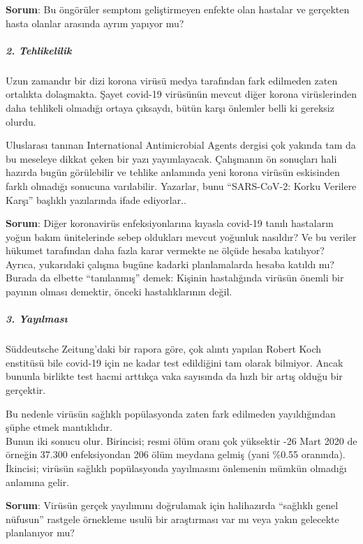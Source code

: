 \textbf{Sorum}: Bu öngörüler semptom geliştirmeyen enfekte olan hastalar
ve gerçekten hasta olanlar arasında ayrım yapıyor mu?

\hypertarget{2-tehlikelilik}{%
\subparagraph{\texorpdfstring{\textbf{2.
Tehlikelilik}}{2. Tehlikelilik}}\label{2-tehlikelilik}}

Uzun zamandır bir dizi korona virüsü medya tarafından fark edilmeden
zaten ortalıkta dolaşmakta. Şayet covid-19 virüsünün mevcut diğer korona
virüslerinden daha tehlikeli olmadığı ortaya çıksaydı, bütün karşı
önlemler belli ki gereksiz olurdu.

Uluslarası tanınan International Antimicrobial Agents dergisi çok
yakında tam da bu meseleye dikkat çeken bir yazı yayımlayacak.
Çalışmanın ön sonuçları hali hazırda bugün görülebilir ve tehlike
anlamında yeni korona virüsün eskisinden farklı olmadığı sonucuna
varılabilir. Yazarlar, bunu ``SARS-CoV-2: Korku Verilere Karşı''
başlıklı yazılarında ifade ediyorlar..

\textbf{Sorum}: Diğer koronavirüs enfeksiyonlarına kıyasla covid-19
tanılı hastaların yoğun bakım ünitelerinde sebep oldukları mevcut
yoğunluk nasıldır? Ve bu veriler hükumet tarafından daha fazla karar
vermekte ne ölçüde hesaba katılıyor? Ayrıca, yukarıdaki çalışma bugüne
kadarki planlamalarda hesaba katıldı mı? Burada da elbette
``tanılanmış'' demek: Kişinin hastalığında virüsün önemli bir payının
olması demektir, önceki hastalıklarının değil.

\hypertarget{3-yayux131lmasux131}{%
\subparagraph{\texorpdfstring{\textbf{3.
Yayılması}}{3. Yayılması}}\label{3-yayux131lmasux131}}

Süddeutsche Zeitung'daki bir rapora göre, çok alıntı yapılan Robert Koch
enstitüsü bile covid-19 için ne kadar test edildiğini tam olarak
bilmiyor. Ancak bununla birlikte test hacmi arttıkça vaka sayısında da
hızlı bir artış olduğu bir gerçektir.

Bu nedenle virüsün sağlıklı popülasyonda zaten fark edilmeden
yayıldığından şüphe etmek mantıklıdır.\\
Bunun iki sonucu olur. Birincisi; resmi ölüm oranı çok yüksektir -26
Mart 2020 de örneğin 37.300 enfeksiyondan 206 ölüm meydana gelmiş (yani
\%0.55 oranında). İkincisi; virüsün sağlıklı popülasyonda yayılmasını
önlemenin mümkün olmadığı anlamına gelir.

\textbf{Sorum}: Virüsün gerçek yayılımını doğrulamak için halihazırda
``sağlıklı genel nüfusun'' rastgele örnekleme usulü bir araştırması var
mı veya yakın gelecekte planlanıyor mu?

